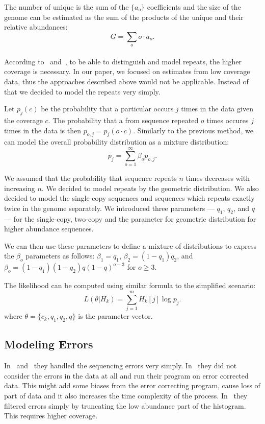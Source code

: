 The number of unique \kmers is the sum of the $\{a_o\}$ coefficients and the size of the genome can be estimated as the sum of the products of the unique \kmers and their relative abundances:
$$G = \sum_o o\cdot a_o.$$

\paragraph{} According to~\cite{waterman} and~\cite{williams}, to be able to distinguish and model repeats, the higher coverage is necessary. In our paper\cite{covest}, we focused on estimates from low coverage data, thus the approaches described above would not be applicable. Instead of that we decided to model the repeats very simply.

Let $p_j(c)$ be the probability that a particular \kmer occurs $j$ times in the data given the coverage $c$. The probability that a \kmer from sequence repeated $o$ times occures $j$ times in the data is then $p_{o,j} = p_j(o\cdot c)$.
Similarly to the previous method, we can model the overall probability distribution as a mixture distribution:
$$p_j = \sum_{o=1}^\infty \beta_o p_{o,j}.$$

We assumed that the probability that sequence repeats $n$ times decreases with increasing $n$. We decided to model repeats by the geometric distribution. We also decided to model the single-copy sequences and sequences which repeats exactly twice in the genome separately. We introduced three parameters --- $q_1$, $q_2$, and $q$ --- for the single-copy, two-copy and the parameter for geometric distribution for higher abundance sequences.

We can then use these parameters to define a mixture of distributions to express the $\beta_o$ parameters as follows:
$\beta_1 = q_1$, $\beta_2 = (1-q_1) q_2$, and $\beta_o =
(1-q_1)(1-q_2)q(1-q)^{o-3}$ for $o\ge 3$.

The likelihood can be computed using similar formula to the simplified scenario:
$$L(\theta | H_k) = \sum_{j=1}^m H_k[j] \log p_j.$$
where $\theta = \{c_k, q_1, q_2, q\}$ is the parameter vector.

\subsection{Modeling Errors}

In~\cite{waterman} and~\cite{williams} they handled the sequencing errors very simply. In~\cite{waterman} they did not consider the errors in the data at all and run their program on error corrected data. This might add some biases from the error correcting program, cause loss of part of data and it also increases the time complexity of the process. In~\cite{williams} they filtered errors simply by truncating the low abundance part of the histogram. This requires higher coverage.

